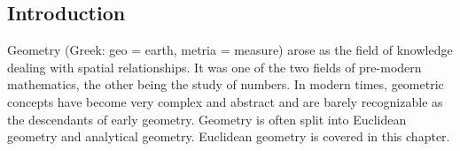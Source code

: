             \subsection{ Introduction}
            \nopagebreak
      \label{m39354*id62184}Geometry (Greek: geo = earth, metria = measure) arose as the field of knowledge dealing with spatial relationships. It was one of the two fields of pre-modern mathematics, the other being the study of numbers. In modern times, geometric concepts have become very complex and abstract and are barely recognizable as the descendants of early geometry. Geometry is often split into Euclidean geometry and analytical geometry. Euclidean geometry is covered in this chapter.\par 
%             
%         
%       
    \label{m39354*uid52}
